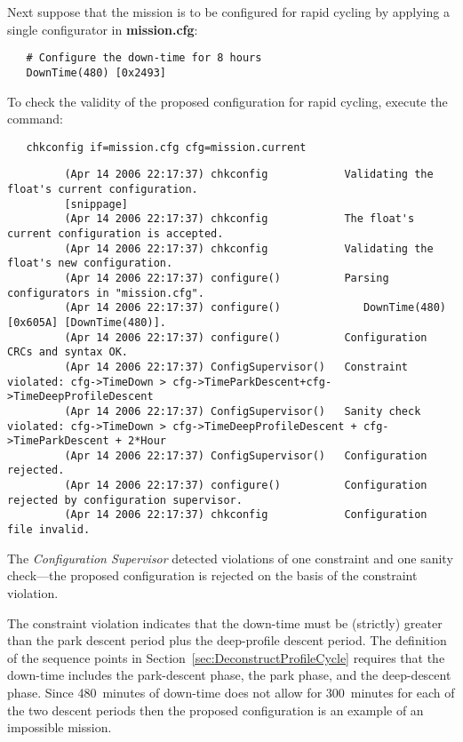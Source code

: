 Next suppose that the mission is to be configured for rapid cycling by
applying a single configurator in \textbf{mission.cfg}:
\begin{verbatim}
   # Configure the down-time for 8 hours
   DownTime(480) [0x2493]
\end{verbatim}

To check the validity of the proposed configuration for rapid cycling,
execute the command:
\begin{verbatim}
   chkconfig if=mission.cfg cfg=mission.current
\end{verbatim}
{\tiny \begin{verbatim}
         (Apr 14 2006 22:17:37) chkconfig            Validating the float's current configuration.
         [snippage]
         (Apr 14 2006 22:17:37) chkconfig            The float's current configuration is accepted.
         (Apr 14 2006 22:17:37) chkconfig            Validating the float's new configuration.
         (Apr 14 2006 22:17:37) configure()          Parsing configurators in "mission.cfg".
         (Apr 14 2006 22:17:37) configure()             DownTime(480) [0x605A] [DownTime(480)].
         (Apr 14 2006 22:17:37) configure()          Configuration CRCs and syntax OK.
         (Apr 14 2006 22:17:37) ConfigSupervisor()   Constraint violated: cfg->TimeDown > cfg->TimeParkDescent+cfg->TimeDeepProfileDescent
         (Apr 14 2006 22:17:37) ConfigSupervisor()   Sanity check violated: cfg->TimeDown > cfg->TimeDeepProfileDescent + cfg->TimeParkDescent + 2*Hour
         (Apr 14 2006 22:17:37) ConfigSupervisor()   Configuration rejected.
         (Apr 14 2006 22:17:37) configure()          Configuration rejected by configuration supervisor.
         (Apr 14 2006 22:17:37) chkconfig            Configuration file invalid.
\end{verbatim}}
   
The \emph{Configuration Supervisor} detected violations of one constraint
and one sanity check---the proposed configuration is rejected on the basis
of the constraint violation.  

The constraint violation indicates that the down-time must be (strictly)
greater than the park descent period plus the deep-profile descent period.
The definition of the sequence points in
Section~\ref{sec:DeconstructProfileCycle} requires that the down-time
includes the park-descent phase, the park phase, and the deep-descent phase.
Since 480~minutes of down-time does not allow for 300~minutes for each of
the two descent periods then the proposed configuration is an example of an
impossible mission.

